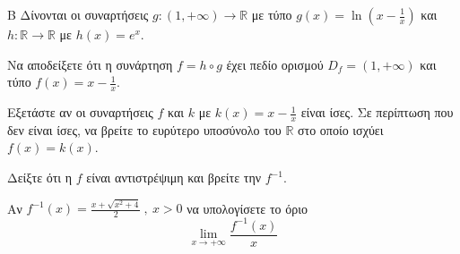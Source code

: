 \begin{thema}{Β}
Δίνονται οι συναρτήσεις $g:(1,+\infty)\to\mathbb{R}$ με τύπο $g(x)=\ln{\left(x-\frac{1}{x}\right)}$ και $h:\mathbb{R}\to\mathbb{R}$ με $h(x)=e^x$.
\begin{erwthma}
\item Να αποδείξετε ότι η συνάρτηση $f=h\circ g$ έχει πεδίο ορισμού $D_f=(1,+\infty)$ και τύπο $f(x)=x-\frac{1}{x}$.
\item Εξετάστε αν οι συναρτήσεις $f$ και $k$ με $k(x)=x-\frac{1}{x}$ είναι ίσες. Σε περίπτωση που δεν είναι ίσες, να βρείτε το ευρύτερο υποσύνολο του $\mathbb{R}$ στο οποίο ισχύει $f(x)=k(x)$.
\item Δείξτε ότι η $f$ είναι αντιστρέψιμη και βρείτε την $f^{-1}$.
\item Αν $f^{-1}(x)=\frac{x+\sqrt{x^2+4}}{2}\ ,\ x>0$ να υπολογίσετε το όριο
\[ \lim\limits_{x\to+\infty}{\frac{f^{-1}(x)}{x}} \]
\end{erwthma}
\end{thema}
